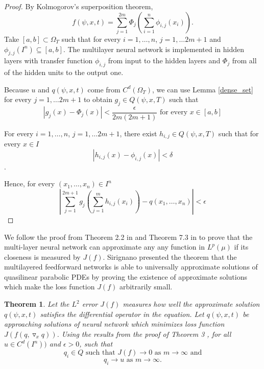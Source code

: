 \documentclass{article}
\newtheorem{theorem}{Theorem}[section]
\begin{document}
\begin{proof}

    By Kolmogorov's superposition theorem,
    \[f(\psi,x,t)=\sum_{j=1}^{2m}\Phi_{j}\left(\sum_{i=1}^{n}\phi_{i,j}(x_i)\right).\]
    Take $[a,b] \subset \Omega_{T}$ such that for every $i=1,\dots,n$, $j=1, \dots 2m+1$ and $\phi_{j,j}(\textit{I}^{n})\subseteq [a,b]$.
    The multilayer neural network is implemented in hidden layers with transfer function $\phi_{i,j}$ from input to the hidden layers and $\Phi_j$ from all of the hidden units to the output one.

	
	

Because $u$ and $q(\psi,x,t)$ come from $C^{d}(\Omega_{T})$, 
we can use Lemma \ref{dense_set} for every $j = 1, \dots 2m+1$ to obtain $g_{j} \in Q(\psi,x,T)$ such that
\begin{equation}
\left|g_{j}(x)-\Phi_{j}(x)\right|<\frac{\epsilon}{2m(2m+1)} \text{ for every } x \in [a,b]
\end{equation}

	 
		
	For every $i=1,\dots,n$, $j=1, \dots 2m+1$, there exist $h_{i,j} \in Q(\psi,x,T)$ such that for every $x \in \textit{I}$
	\[\left|h_{i,j}(x)-\phi_{i,j}(x)\right|<\delta \].

	Hence, for every $(x_1, \dots , x_n)\in \textit{I}^{n}$
	\[	\left|\sum_{j=1}^{2m+1}g_{j}\left(\sum_{j=1}^{m}h_{i,j}(x_i)\right)-q(x_1,\dots,x_n)\right| < \epsilon\]


\end{proof}
We follow the proof from Theorem 2.2 in \cite{kurkova} and Theorem 7.3 in \cite{sirignano} to prove that the multi-layer neural network can approximate any any function in $L^{p}(\mu)$ if its closeness is measured by $J(f)$. 
Sirignano \cite{sirignano} presented the theorem that the multilayered feedforward networks is able to universally approximate solutions of quasilinear parabolic PDEs by proving the existence of approximate solutions which make the loss function $J(f)$ arbitrarily small.
\begin{theorem}
	Let the $L^{2}$ error $J(f)$ measures how well the approximate solution $q(\psi,x,t)$ satisfies the differential operator in the equation.  
Let $q(\psi,x,t)$ be approaching solutions of  neural network which minimizes loss function $J(f(q,\triangledown_{x} q))$. 
Using the results from the proof of Theorem 3 \cite{hornik}, for all $u \in C^{d}(I^{n}))$ and $\epsilon > 0$, such that
\[q_i \in \textit{Q} \textrm{ such that } J(f) \rightarrow 0 \textrm{ as } m \rightarrow \infty \text{ and}\]
\[ q_{i} \rightarrow u  \text{ as } m \rightarrow \infty.\] 
\end{theorem}
\end{document}
